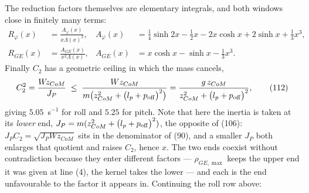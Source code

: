 \documentclass[10pt]{article}
\newcommand{\Wz}{W\!z_{CoM}}
\newcommand{\lpo}{\bigl(l_p + p_{\rm off}\bigr)}
\begin{document}
The reduction factors themselves are elementary integrals, and both windows close
in finitely many terms:
\begin{equation}
\begin{aligned}
  R_\varphi(x) &= \frac{A_\varphi(x)}{x\Lambda(x)^2}, &
  A_\varphi(x) &= \tfrac14\sinh 2x - \tfrac12 x
                  - 2x\cosh x + 2\sinh x + \tfrac13x^3, \\[2pt]
  R_{GE}(x) &= \frac{A_{GE}(x)}{x^{2}\Lambda(x)}, &
  A_{GE}(x) &= x\cosh x - \sinh x - \tfrac13x^3 .
\end{aligned}
  \tag{111}
\end{equation}
Finally $C_2$ has a geometric ceiling in which the mass cancels,
\begin{equation}
  C_2^{2} = \frac{\Wz}{J_P}
  \;\le\; \frac{W z_{CoM}}{m\bigl(z_{CoM}^2 + \lpo^2\bigr)}
  = \frac{g\,z_{CoM}}{z_{CoM}^2 + \lpo^2} ,
  \tag{112}
\end{equation}
giving $5.05$~s$^{-1}$ for roll and $5.25$ for pitch. Note that here the
inertia is taken at its \emph{lower} end, $J_P = m(z_{CoM}^2+\lpo^2)$,
the opposite of (106): $J_PC_2 = \sqrt{J_P\Wz}$ sits in the denominator
of (90), and a smaller $J_P$ both enlarges that quotient and raises
$C_2$, hence $x$. The two ends coexist without contradiction because
they enter different factors --- $\rho_{GE,\max}$ keeps the upper end it
was given at line (4), the kernel takes the lower --- and each is the
end unfavourable to the factor it appears in. Continuing the roll row
above:
\end{document}
